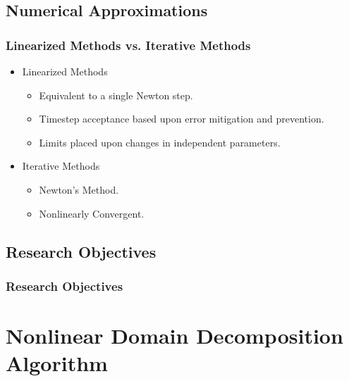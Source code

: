 \documentclass[compress,xcolor=table]{beamer}
\begin{document}
\subsection[Numerical Approximations]{Numerical Approximations}
\begin{frame}
\frametitle{Linearized Methods vs. Iterative Methods}

\begin{itemize}
\item{Linearized Methods
\begin{itemize}
\item{Equivalent to a single Newton step.}
\item{Timestep acceptance based upon error mitigation and prevention.}
\item{Limits placed upon changes in independent parameters.}
\end{itemize}
}
\item{Iterative Methods
\begin{itemize}
\item{Newton's Method.}
\item{Nonlinearly Convergent.}
\end{itemize}
}
\end{itemize}

\begin{figure}[t]
\centering
\resizebox{1.0\textwidth}{!}{

}
\end{figure}

\end{frame}
\subsection[Research Objectives]{Research Objectives}
\begin{frame}
\frametitle{Research Objectives}

\begin{figure}[t]
\centering
\resizebox{!}{0.7\textheight}{

}
\end{figure}

\end{frame}
\section[Work]{Nonlinear Domain Decomposition Algorithm}
\end{document}
